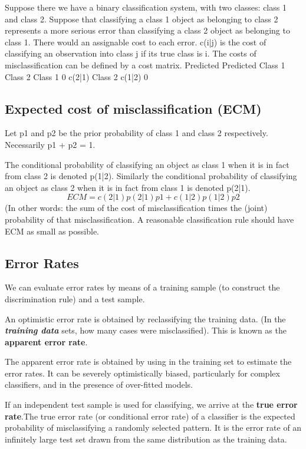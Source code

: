 \documentclass[a4paper,12pt]{article}
\begin{document}
Suppose there we have a binary classification system, with two classes:
class 1 and class 2. Suppose that classifying a class 1 object as belonging
to class 2 represents a more serious error than classifying a class 2 object as
belonging to class 1. There would an assignable cost to each error. c(i|j) is
the cost of classifying an observation into class j if its true class is i. The
costs of misclassification can be defined by a cost matrix.
Predicted Predicted
Class 1 Class 2
Class 1 0 c(2|1)
Class 2 c(1|2) 0
\subsection*{ Expected cost of misclassification (ECM)}
Let p1 and p2 be the prior probability of class 1 and class 2 respectively.
Necessarily p1 + p2 = 1.

The conditional probability of classifying an object as class 1 when it is
in fact from class 2 is denoted p(1|2). Similarly the conditional probability
of classifying an object as class 2 when it is in fact from class 1 is denoted
p(2|1).
\[ ECM = c(2|1)p(2|1)p1 + c(1|2)p(1|2)p2\]
(In other words: the sum of the cost of misclassification times the (joint)
probability of that misclassification.
A reasonable classification rule should have ECM as small as possible.

\subsection{Error Rates}

We can evaluate error rates by means of a training sample (to construct the discrimination rule) and a test sample.


An optimistic error rate is obtained by reclassifying the training data. (In the \textbf{\textit{training data}} sets, how many cases were misclassified). This is known as the \textbf{apparent error rate}.


The apparent error rate is obtained by using in the training set to estimate
the error rates. It can be severely optimistically biased, particularly for complex classifiers, and in the presence of over-fitted models.


If an independent test sample is used for classifying, we arrive at the  \textbf{true error rate}.The true error rate (or conditional error rate) of a classifier is the expected
probability of misclassifying a randomly selected pattern.
It is the error rate of an infinitely large test set drawn from the same distribution as the training data.
\end{document}
